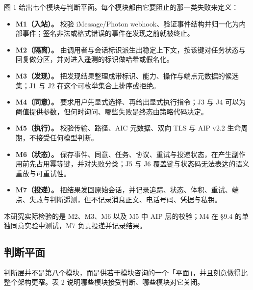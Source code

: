 \documentclass[11pt,a4paper]{article}
\begin{document}
图 1 给出七个模块与判断平面。每个模块都由它要阻止的那一类失败来定义：

\begin{itemize}

\item \textbf{M1（入站）。} 校验 iMessage/Photon webhook、验证事件结构并归一化为内部事件；签名非法或格式错误的事件在发现之前就被终止。

\item \textbf{M2（隔离）。} 由调用者与会话标识派生出稳定上下文，按该键对任务状态与回复做分区，并对进入遥测的标识做哈希或假名化。

\item \textbf{M3（发现）。} 把发现结果整理成带标识、能力、操作与端点元数据的候选集；J1 与 J2 在这个可枚举集合上排序或拒绝。

\item \textbf{M4（同意）。} 要求用户先显式选择、再给出显式执行指令；J3 与 J4 可以为阈值提供参数，但何时询问、哪些失败是终态由策略代码决定。

\item \textbf{M5（执行）。} 校验传输、路径、AIC 元数据、双向 TLS 与 AIP v2.2 生命周期，不接受任何模型判断。

\item \textbf{M6（状态）。} 保存事件、同意、任务、协议、重试与投递状态，在产生副作用前先占用幂等键，并对失败分类；J5 与 J6 覆盖键与状态码无法表达的语义重放与可重试性。

\item \textbf{M7（投递）。} 把结果发回原始会话，并记录追踪、状态、体积、重试、端点、失败与判断遥测，但不记录消息正文、电话号码、凭据与私钥。

\end{itemize}

本研究实际检验的是 M2、M3、M6 以及 M5 中 AIP 层的校验；M4 在 §9.4 的单独同意实验中测试，M7 负责投递并记录结果。

\subsection{判断平面}

判断层并不是第八个模块，而是供若干模块咨询的一个「平面」，并且刻意做得比整个架构更窄。表 2 说明哪些模块接受判断、哪些模块对它关闭。
\end{document}
